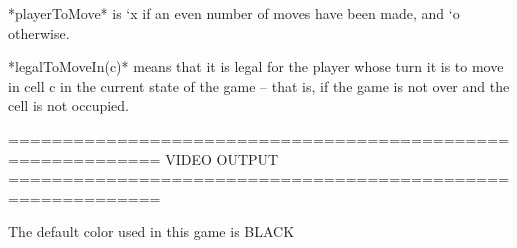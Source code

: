 \documentclass{led_doc}
\begin{document}
\begin{ledDef}
\end{ledDef}

\begin{ledCmnt}
*playerToMove* is `x if an even number of moves have been made, and `o otherwise.
\end{ledCmnt}

\begin{ledDef}
\end{ledDef}

\begin{ledDef}
\end{ledDef}

\begin{ledCmnt}
*legalToMoveIn(c)* means that it is legal for the player whose turn it is to move in cell c in the current state of the game -- that is, if the game is not over and the cell is not occupied.
\end{ledCmnt}

\begin{ledDef}
\end{ledDef}

\begin{ledCmnt}
============================================================
VIDEO OUTPUT
============================================================

The default color used in this game is BLACK
\end{ledCmnt}

\begin{ledDef}
\end{ledDef}

\begin{ledDef}
\end{ledDef}

\begin{ledDef}
\end{ledDef}

\begin{ledDef}
\end{ledDef}
\end{document}
